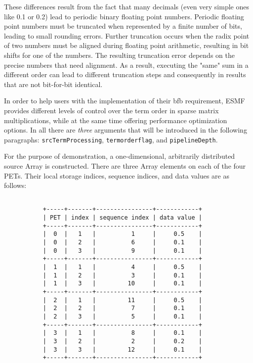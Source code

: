 
   These differences result from the fact that many decimals (even very simple
   ones like 0.1 or 0.2) lead to periodic binary floating point numbers.
   Periodic floating point numbers must be truncated when represented by a
   finite number of bits, leading to small rounding errors. Further truncation
   occurs when the radix point of two numbers must be aligned during
   floating point arithmetic, resulting in bit shifts for one of the
   numbers. The resulting truncation error depends on the precise numbers that
   need alignment. As a result, executing the "same" sum in a different order
   can lead to different truncation steps and consequently in results that are
   not bit-for-bit identical.
  
   In order to help users with the implementation of their bfb requirement, 
   ESMF provides different levels of control over the term order in sparse 
   matrix multiplications, while at the same time offering performance 
   optimization options. In all there are {\em three} arguments that will be
   introduced in the following paragraphs: {\tt srcTermProcessing}, 
   {\tt termorderflag}, and {\tt pipelineDepth}.
  
   For the purpose of demonstration, a one-dimensional, arbitrarily distributed 
   source Array is constructed. There are three Array elements on each of the
   four PETs. Their local storage indices, sequence indices, and data values
   are as follows:
  
   \begin{verbatim}
  
           +-----+-------+----------------+------------+
           | PET | index | sequence index | data value |
           +-----+-------+----------------+------------+
           |  0  |   1   |          1     |     0.5    |
           |  0  |   2   |          6     |     0.1    |
           |  0  |   3   |          9     |     0.1    |
           +-----+-------+----------------+------------+
           |  1  |   1   |          4     |     0.5    |
           |  1  |   2   |          3     |     0.1    |
           |  1  |   3   |         10     |     0.1    |
           +-----+-------+----------------+------------+
           |  2  |   1   |         11     |     0.5    |
           |  2  |   2   |          7     |     0.1    |
           |  2  |   3   |          5     |     0.1    |
           +-----+-------+----------------+------------+
           |  3  |   1   |          8     |     0.1    |
           |  3  |   2   |          2     |     0.2    |
           |  3  |   3   |         12     |     0.1    |
           +-----+-------+----------------+------------+
  
   \end{verbatim} 

